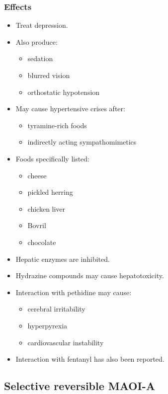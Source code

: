 \documentclass[11pt,a4paper]{article}
\begin{document}
\subsubsection{Effects}
\begin{itemize}
  \item Treat depression.
  \item Also produce:
  \begin{itemize}
    \item sedation
    \item blurred vision
    \item orthostatic hypotension
  \end{itemize}
  \item May cause hypertensive crises after:
  \begin{itemize}
    \item tyramine-rich foods
    \item indirectly acting sympathomimetics
  \end{itemize}
  \item Foods specifically listed:
  \begin{itemize}
    \item cheese
    \item pickled herring
    \item chicken liver
    \item Bovril
    \item chocolate
  \end{itemize}
  \item Hepatic enzymes are inhibited.
  \item Hydrazine compounds may cause hepatotoxicity.
  \item Interaction with pethidine may cause:
  \begin{itemize}
    \item cerebral irritability
    \item hyperpyrexia
    \item cardiovascular instability
  \end{itemize}
  \item Interaction with fentanyl has also been reported.
\end{itemize}

\subsection{Selective reversible MAOI-A}
\end{document}
